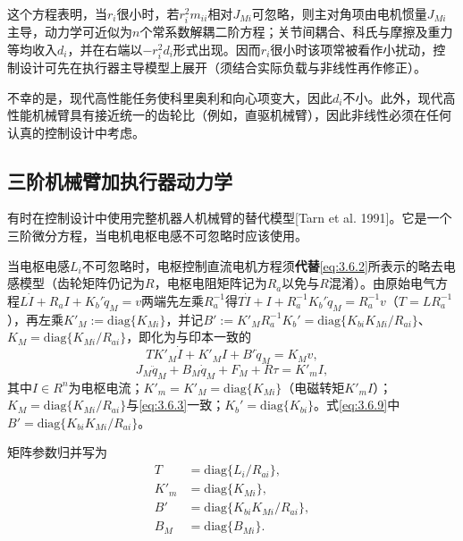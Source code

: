 \documentclass[12pt,a4paper]{ctexart}
\begin{document}
这个方程表明，当$r_i$很小时，若$r_i^2 m_{ii}$相对$J_{Mi}$可忽略，则主对角项由电机惯量$J_{Mi}$主导，动力学可近似为$n$个常系数解耦二阶方程；关节间耦合、科氏与摩擦及重力等均收入$d_i$，并在右端以$-r_i^2 d_i$形式出现。因而$r_i$很小时该项常被看作小扰动，控制设计可先在执行器主导模型上展开（须结合实际负载与非线性再作修正）。

不幸的是，现代高性能任务使科里奥利和向心项变大，因此$d_i$不小。此外，现代高性能机械臂具有接近统一的齿轮比（例如，直驱机械臂），因此非线性必须在任何认真的控制设计中考虑。

\subsection{三阶机械臂加执行器动力学}

有时在控制设计中使用完整机器人机械臂的替代模型[Tarn et al. 1991]。它是一个三阶微分方程，当电机电枢电感不可忽略时应该使用。

当电枢电感$L_i$不可忽略时，电枢控制直流电机方程须\textbf{代替}\eqref{eq:3.6.2}所表示的略去电感模型（齿轮矩阵仍记为$R$，电枢电阻矩阵记为$R_a$以免与$R$混淆）。由原始电气方程$L\dot{I}+R_a I+K_b'\dot{q}_M=v$两端先左乘$R_a^{-1}$得$T\dot{I}+I+R_a^{-1}K_b'\dot{q}_M=R_a^{-1}v$（$T=LR_a^{-1}$），再左乘$K'_M:=\mathrm{diag}\{K_{Mi}\}$，并记$B':=K'_M R_a^{-1}K_b'=\mathrm{diag}\{K_{bi}K_{Mi}/R_{ai}\}$、$K_M=\mathrm{diag}\{K_{Mi}/R_{ai}\}$，即化为与印本一致的
\begin{equation}\label{eq:3.6.9}
T K'_M \dot{I} + K'_M I + B' \dot{q}_M = K_M v,
\end{equation}
\begin{equation}\label{eq:3.6.10}
J_M \ddot{q}_M + B_M \dot{q}_M + F_M + R\tau = K'_m I,
\end{equation}
其中$I\in R^n$为电枢电流；$K'_m=K'_M=\mathrm{diag}\{K_{Mi}\}$（电磁转矩$K'_m I$）；$K_M=\mathrm{diag}\{K_{Mi}/R_{ai}\}$与\eqref{eq:3.6.3}一致；$K_b'=\mathrm{diag}\{K_{bi}\}$。式\eqref{eq:3.6.9}中$B'=\mathrm{diag}\{K_{bi}K_{Mi}/R_{ai}\}$。

矩阵参数归并写为
\begin{equation}\label{eq:3.6.11}
\begin{aligned}
T &= \mathrm{diag}\{L_i/R_{ai}\}, \\
K'_m &= \mathrm{diag}\{K_{Mi}\}, \\
B' &= \mathrm{diag}\{K_{bi}K_{Mi}/R_{ai}\}, \\
B_M &= \mathrm{diag}\{B_{Mi}\}.
\end{aligned}
\end{equation}
\end{document}
